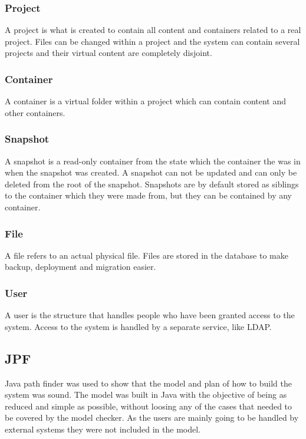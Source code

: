\documentclass[a4paper,12pt]{article}
\begin{document}
\subsubsection{Project}
A project is what is created to contain all content and containers related to a real project. Files can be changed 
within a project and the system can contain several projects and their virtual content are completely disjoint.

\subsubsection{Container}
A container is a virtual folder within a project which can contain content and other containers.

\subsubsection{Snapshot}
A snapshot is a read-only container from the state which the container the was in when the snapshot was created. 
A snapshot can not be updated and can only be deleted from the root of the snapshot. Snapshots are by default stored 
as siblings to the container which they were made from, but they can be contained by any container.

\subsubsection{File}
A file refers to an actual physical file. Files are stored in the database to make backup, deployment and migration easier.

\subsubsection{User}
A user is the structure that handles people who have been granted access to the system.
Access to the system is handled by a separate service, like LDAP.

\subsection{JPF}
Java path finder was used to show that the model and plan of how to build the system was sound. The model was built in Java 
with the objective of being as reduced and simple as possible, without loosing any of the cases that needed to be covered 
by the model checker. As the users are mainly going to be handled by external systems they were not included in the model.
\end{document}
